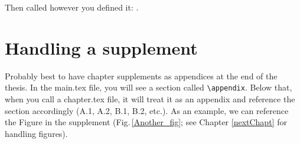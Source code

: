 Then called however you defined it: \oddname.

\section{Handling a supplement}

Probably best to have chapter supplements as appendices at the end of the thesis. In the main.tex file, you will see a section called \verb+\appendix+. Below that, when you call a chapter.tex file, it will treat it as an appendix and reference the section accordingly (A.1, A.2, B.1, B.2, etc.). As an example, we can reference the Figure in the supplement (Fig.\,\ref{Another_fig}; see Chapter \ref{nextChapt} for handling figures). 










